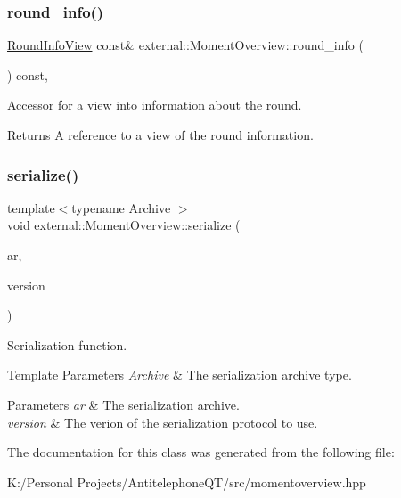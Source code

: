 \subsubsection{\texorpdfstring{round\+\_\+info()}{round\_info()}}
{\footnotesize\ttfamily \hyperlink{classroundinfo_1_1_round_info_view}{Round\+Info\+View} const\& external\+::\+Moment\+Overview\+::round\+\_\+info (\begin{DoxyParamCaption}{ }\end{DoxyParamCaption}) const\hspace{0.3cm}{\ttfamily [inline]}, {\ttfamily [noexcept]}}



Accessor for a view into information about the round. 

\begin{DoxyReturn}{Returns}
A reference to a view of the round information. 
\end{DoxyReturn}
\mbox{\label{classexternal_1_1_moment_overview_a5791e663d0c7be6c1a19b0b7af416855}} 
\subsubsection{\texorpdfstring{serialize()}{serialize()}}
{\footnotesize\ttfamily template$<$typename Archive $>$ \\
void external\+::\+Moment\+Overview\+::serialize (\begin{DoxyParamCaption}\item[{Archive \&}]{ar,  }\item[{unsigned int const}]{version }\end{DoxyParamCaption})\hspace{0.3cm}{\ttfamily [inline]}}



Serialization function. 


\begin{DoxyTemplParams}{Template Parameters}
{\em Archive} & The serialization archive type. \\
\hline
\end{DoxyTemplParams}

\begin{DoxyParams}{Parameters}
{\em ar} & The serialization archive. \\
\hline
{\em version} & The verion of the serialization protocol to use. \\
\hline
\end{DoxyParams}


The documentation for this class was generated from the following file\+:\begin{DoxyCompactItemize}
\item 
K\+:/\+Personal Projects/\+Antitelephone\+Q\+T/src/momentoverview.\+hpp\end{DoxyCompactItemize}
